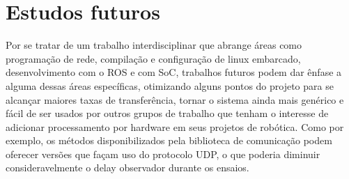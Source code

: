 \chapter{Estudos futuros}\label{cap:trabfut}

Por se tratar de um trabalho interdisciplinar que abrange áreas como programação de rede, compilação e configuração de linux embarcado, desenvolvimento com o ROS e com SoC, trabalhos futuros podem dar ênfase a alguma dessas áreas específicas, otimizando alguns pontos do projeto para se alcançar maiores taxas de transferência, tornar o sistema ainda mais genérico e fácil de ser usados por outros grupos de trabalho que tenham o interesse de adicionar processamento por hardware em seus projetos de robótica. Como por exemplo, os métodos disponibilizados pela biblioteca de comunicação podem oferecer versões que façam uso do protocolo UDP, o que poderia diminuir consideravelmente o delay observador durante os ensaios. 
